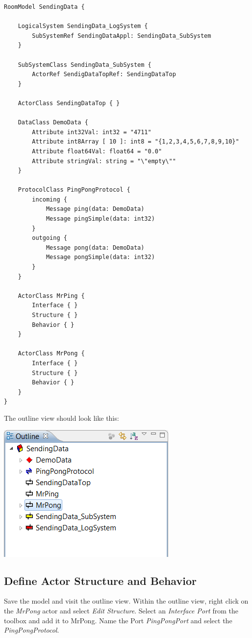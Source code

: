 \begin{verbatim}
RoomModel SendingData {

    LogicalSystem SendingData_LogSystem {
        SubSystemRef SendingDataAppl: SendingData_SubSystem
    }

    SubSystemClass SendingData_SubSystem {
        ActorRef SendigDataTopRef: SendingDataTop
    }

    ActorClass SendingDataTop { }

    DataClass DemoData {
        Attribute int32Val: int32 = "4711"
        Attribute int8Array [ 10 ]: int8 = "{1,2,3,4,5,6,7,8,9,10}"
        Attribute float64Val: float64 = "0.0"
        Attribute stringVal: string = "\"empty\""
    }

    ProtocolClass PingPongProtocol {
        incoming {
            Message ping(data: DemoData)
            Message pingSimple(data: int32)
        }
        outgoing {
            Message pong(data: DemoData)
            Message pongSimple(data: int32)
        }
    }

    ActorClass MrPing {
        Interface { }
        Structure { }
        Behavior { }
    }

    ActorClass MrPong {
        Interface { }
        Structure { }
        Behavior { }
    }
} 

\end{verbatim}

The outline view should look like this:

\includegraphics{images/025-SendingData03.png}

\subsection{Define Actor Structure and Behavior}

Save the model and visit the outline view. Within the outline view, right click on the \textit{MrPong} 
actor and select \textit{Edit Structure}. Select an \textit{Interface Port} from the toolbox and add it to 
MrPong. Name the Port \textit{PingPongPort} and select the \textit{PingPongProtocol}.


